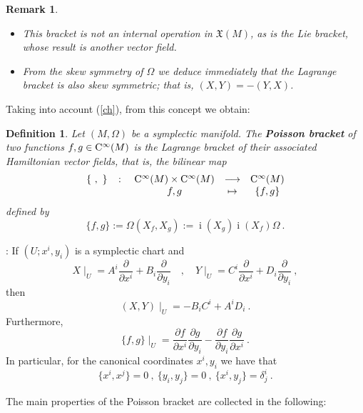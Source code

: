 \documentclass[12pt]{report}
\newtheorem{definition}[teor]{Definition}
\newtheorem{remark}[teor]{Remark}
\def\derpar#1#2{\frac{\partial{#1}}{\partial{#2}}}
\def\vf{\mathfrak X}
\def\inn{\mathop{i}\nolimits}
\def\Cinfty{{\rm C}^\infty}
\begin{document}
\begin{remark}{\rm 
\begin{itemize}
\item
This bracket is not an internal operation in  $\vf (M)$, as is the {\sl  Lie bracket},
whose result is another vector field.
\item
From the skew symmetry of $\Omega$ we deduce immediately that the Lagrange bracket is also skew symmetric; that is,
$(X,Y) = -(Y,X)$.
\end{itemize}
}\end{remark}

Taking into account (\ref{ch}), from this concept we obtain:
 
\begin{definition}
Let $(M,\Omega )$ be a symplectic manifold.
The \textbf{Poisson bracket} of two functions $f,g \in \Cinfty (M)$
is the Lagrange bracket of their associated Hamiltonian vector fields,
that is, the bilinear map
$$
\begin{array}{ccccc}
\{\ ,\ \} & \colon &
\Cinfty (M) \times \Cinfty (M) & \longrightarrow & \Cinfty (M)
\\
& & f,g & \mapsto & \{ f,g \}
\end{array}
$$
defined by
$$
\{ f,g \} := \Omega (X_f,X_g) := \inn(X_g)\inn(X_f)\Omega \ .
$$
\end{definition}

:
If $(U;x^i,y_i)$ is a symplectic chart and
$$
X\mid_U = A^i\derpar{}{x^i}+B_i\derpar{}{y_i} \quad ,
\quad
Y\mid_U = C^i\derpar{}{x^i}+D_i\derpar{}{y_i} \ ,
$$
then
$$
(X,Y)\mid_U = -B_iC^i+A^iD_i \ .
$$
Furthermore,
$$
\{ f,g \}\mid_U =
\derpar{f}{x^i}\derpar{g}{y_i} - \derpar{f}{y_i}\derpar{g}{x^i} \ .
$$
In particular, for  the canonical coordinates $x^i,y_i$ we have that
$$
\{ x^i,x^j \} = 0 \ , \
\{ y_i,y_j \} = 0 \ , \
\{ x^i,y_j \} =  \delta^i_j \ .
$$

The main properties of the Poisson bracket are collected in  the following:
\end{document}
